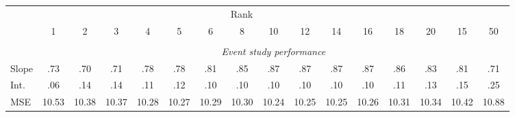 \footnotesize
\begin{tabular}{@{\extracolsep{-9pt}} lccccccccccccccc} 
\toprule \multicolumn{15}{c}{{Rank}}\\
\multicolumn{1}{c}{} & 1 & 2 & 3 & 4 & 5 & 6 & 8 & 10 & 12 & 14 & 16 & 18 & 20 & 15 & 50\\\cline{2-16}
\\
\multicolumn{1}{c}{} & \multicolumn{15}{c}{\textit{Event study performance}}\\
\midrule
Slope & .73 & .70 & .71 & .78 & .78 & .81 & .85 & .87 & .87 & .87 & .87 & .86 & .83 & .81 & .71\\
Int. & .06 & .14 & .14 & .11 & .12 & .10 & .10 & .10 & .10 & .10 & .10 & .11 & .13 & .15 & .25\\
MSE & 10.53 & 10.38 & 10.37 & 10.28 & 10.27 & 10.29 & 10.30 & 10.24 & 10.25 & 10.25 & 10.26 & 10.31 & 10.34 & 10.42 & 10.88\\
\bottomrule
\end{tabular}